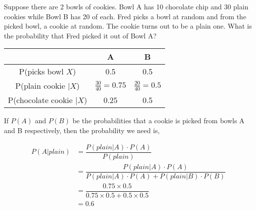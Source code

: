 

\question[3] Suppose there are 2 bowls of cookies. Bowl A has 10 chocolate chip and 30 
	plain cookies while Bowl B has 20 of each. Fred picks a bowl at random 
	and from the picked bowl, a cookie at random. The cookie turns out to be 
	a plain one. What is the probability that Fred picked it out of Bowl A?


\ifprintanswers
		\begin{tabular}{ccc}
		   \toprule
		   & A & B \\
		   \midrule
		   P(picks bowl $X$) & 0.5 & 0.5 \\
		   P(plain cookie $\vert X$) & $\frac{30}{40} = 0.75$ & $\frac{20}{40} = 0.5$ \\
		   P(chocolate cookie $\vert X$) & 0.25 & 0.5 \\
		   \bottomrule
		\end{tabular}
\fi 

\begin{solution}[\halfpage]
	If $P(A)$ and $P(B)$ be the probabilities that a cookie is picked from bowls A and B respectively,
	then the probability we need is, 
	
	\begin{align}
		P(A \vert plain) &= \dfrac{P(plain \vert A) \cdot P(A)}{P(plain)} \\
		  &= \dfrac{P(plain \vert A) \cdot P(A)}{P(plain \vert A)\cdot P(A) + P(plain \vert B)\cdot P(B)} \\
		  &= \dfrac{0.75 \times 0.5}{0.75\times 0.5 + 0.5\times 0.5} \\
		  &= 0.6
	\end{align}

\end{solution}
